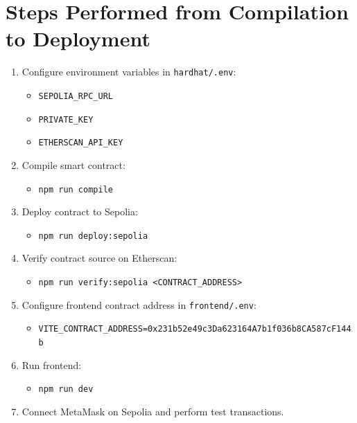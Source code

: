 \documentclass[12pt,a4paper]{article}
\begin{document}
\section{Steps Performed from Compilation to Deployment}
\begin{enumerate}[leftmargin=*]
    \item Configure environment variables in \texttt{hardhat/.env}:
    \begin{itemize}[leftmargin=*]
        \item \texttt{SEPOLIA\_RPC\_URL}
        \item \texttt{PRIVATE\_KEY}
        \item \texttt{ETHERSCAN\_API\_KEY}
    \end{itemize}
    \item Compile smart contract:
    \begin{itemize}[leftmargin=*]
        \item \texttt{npm run compile}
    \end{itemize}
    \item Deploy contract to Sepolia:
    \begin{itemize}[leftmargin=*]
        \item \texttt{npm run deploy:sepolia}
    \end{itemize}
    \item Verify contract source on Etherscan:
    \begin{itemize}[leftmargin=*]
        \item \texttt{npm run verify:sepolia <CONTRACT\_ADDRESS>}
    \end{itemize}
    \item Configure frontend contract address in \texttt{frontend/.env}:
    \begin{itemize}[leftmargin=*]
        \item \texttt{VITE\_CONTRACT\_ADDRESS=0x231b52e49c3Da623164A7b1f036b8CA587cF144b}
    \end{itemize}
    \item Run frontend:
    \begin{itemize}[leftmargin=*]
        \item \texttt{npm run dev}
    \end{itemize}
    \item Connect MetaMask on Sepolia and perform test transactions.
\end{enumerate}
\end{document}
